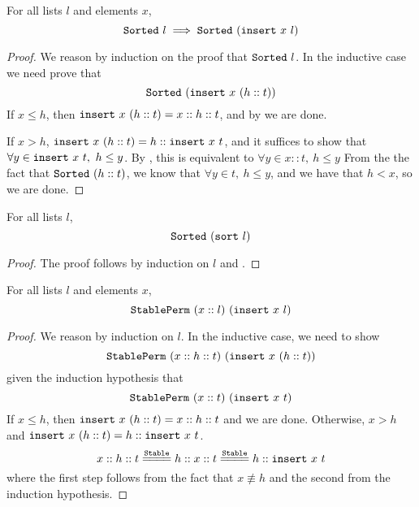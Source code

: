 \documentclass[sigplan,10pt,anonymous,review]{thesis}
\begin{document}
\begin{lemma}
  For all lists $l$ and elements $x$,
  \begin{equation*}
    \texttt{\textup{Sorted}}~l \implies \texttt{\textup{Sorted}}~(\texttt{\textup{insert}}~x~l)
  \end{equation*}
\end{lemma}
\begin{proof}
  We reason by induction on the proof that $\texttt{\textup{Sorted}}~l$. In the
  inductive case we need prove that
  \begin{equation*}
    \texttt{\textup{Sorted}}~(\texttt{\textup{insert}}~x~(h::t))
  \end{equation*}
  If $x \le h$, then $\texttt{\textup{insert}}~x~(h::t) = x :: h :: t$, and by
   we are done.

  If $x > h$, $\texttt{\textup{insert}}~x~(h::t) = h :: \texttt{\textup{insert}}~x~t$, and it
  suffices to show that $\forall y \in \texttt{\textup{insert}}~x~t,~h \le y$. By
  , this is equivalent to $\forall y \in x::t,~h \le y$ From
  the the fact that $\texttt{\textup{Sorted}}~(h::t)$, we know that $\forall y \in t,~h \le
  y$, and we have that $h < x$, so we are done.
\end{proof}

\begin{theorem}
  For all lists $l$,
  \begin{equation*}
    \texttt{\textup{Sorted}}~(\texttt{\textup{sort}}~l)
  \end{equation*}
\end{theorem}
\begin{proof}
  The proof follows by induction on $l$ and .
\end{proof}

\begin{lemma}
  For all lists $l$ and elements $x$,
  \begin{equation*}
    \texttt{\textup{StablePerm}}~(x::l)~(\texttt{\textup{insert}}~x~l)
  \end{equation*}
\end{lemma}
\begin{proof}
  We reason by induction on $l$. In the inductive case, we need to show
  \begin{equation*}
    \texttt{\textup{StablePerm}}~(x::h::t)~(\texttt{\textup{insert}}~x~(h::t))
  \end{equation*}
  given the induction hypothesis that
  \begin{equation*}
    \texttt{\textup{StablePerm}}~(x::t)~(\texttt{\textup{insert}}~x~t)
  \end{equation*}
  If $x \le h$, then $\texttt{\textup{insert}}~x~(h::t) = x :: h :: t$ and we are
  done. Otherwise, $x > h$ and $\texttt{\textup{insert}}~x~(h::t) = h ::
  \texttt{\textup{insert}}~x~t$.
  \begin{equation*}
    x :: h :: t \eqstable h :: x :: t \eqstable h :: \var{insert}~x~t
  \end{equation*}
  where the first step follows from the fact that $x \not\equiv h$ and the
  second from the induction hypothesis.
\end{proof}
\end{document}
